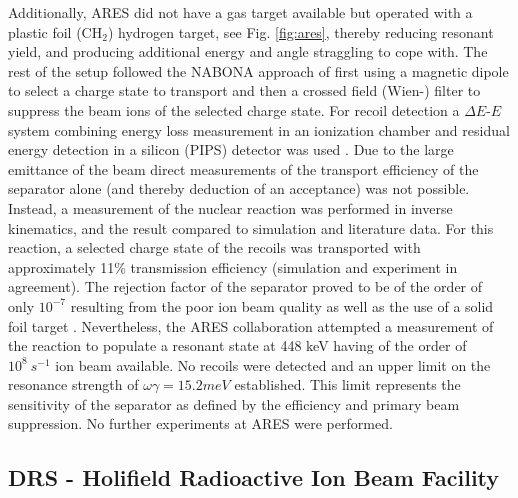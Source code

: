 Additionally, ARES did not have a gas target available but operated with a plastic foil (CH$_2$) hydrogen target, see Fig. \ref{fig:ares}, thereby reducing resonant yield, and producing additional energy and angle straggling to cope with. The rest of the setup followed the NABONA approach of first using a magnetic dipole to select a charge state to transport and then a crossed field (Wien-) filter to suppress the beam ions of the selected charge state. For recoil detection a $\Delta{}E$-$E$ system combining energy loss measurement in an ionization chamber and residual energy detection in a silicon (PIPS) detector was used \cite{coud03}. Due to the large emittance of the beam direct measurements of the transport efficiency of the separator alone (and thereby deduction of an acceptance) was not possible. Instead, a measurement of the nuclear reaction  was performed in inverse kinematics, and the result compared to simulation and literature data. For this reaction, a selected charge state of the  recoils was transported with approximately 11\% transmission efficiency (simulation and experiment in agreement). The rejection factor of the separator proved to be of the order of only $10^{-7}$ resulting from the poor ion beam quality as well as the use of a solid foil target \cite{angu01,coud05}. Nevertheless, the ARES collaboration attempted a measurement of the  reaction to populate a resonant state at 448 keV having of the order of $10^8 ~\unit{s^{-1}}$  ion beam available. No recoils were detected and an upper limit on the resonance strength of $\omega\gamma = 15.2 \unit{meV}$ established. This limit represents the sensitivity of the separator as defined by the efficiency and primary beam suppression. No further experiments at ARES were performed.

\subsection{DRS - Holifield Radioactive Ion Beam Facility}

